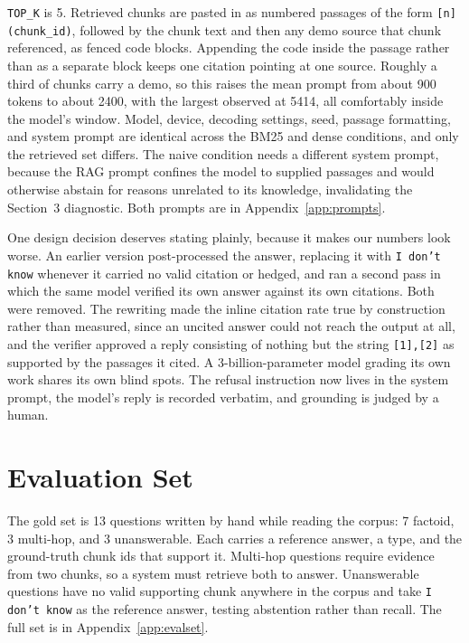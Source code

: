 \documentclass[10pt,a4paper]{article}
\begin{document}
\texttt{TOP\_K} is 5. Retrieved chunks are pasted in as numbered passages of the form \texttt{[n] (chunk\_id)}, followed by the chunk text and then any demo source that chunk referenced, as fenced code blocks. Appending the code inside the passage rather than as a separate block keeps one citation pointing at one source. Roughly a third of chunks carry a demo, so this raises the mean prompt from about 900 tokens to about 2400, with the largest observed at 5414, all comfortably inside the model's window. Model, device, decoding settings, seed, passage formatting, and system prompt are identical across the BM25 and dense conditions, and only the retrieved set differs. The naive condition needs a different system prompt, because the RAG prompt confines the model to supplied passages and would otherwise abstain for reasons unrelated to its knowledge, invalidating the Section~3 diagnostic. Both prompts are in Appendix~\ref{app:prompts}.

One design decision deserves stating plainly, because it makes our numbers look worse. An earlier version post-processed the answer, replacing it with \texttt{I don't know} whenever it carried no valid citation or hedged, and ran a second pass in which the same model verified its own answer against its own citations. Both were removed. The rewriting made the inline citation rate true by construction rather than measured, since an uncited answer could not reach the output at all, and the verifier approved a reply consisting of nothing but the string \texttt{[1],[2]} as supported by the passages it cited. A 3-billion-parameter model grading its own work shares its own blind spots. The refusal instruction now lives in the system prompt, the model's reply is recorded verbatim, and grounding is judged by a human.

\section{Evaluation Set}

The gold set is 13 questions written by hand while reading the corpus: 7 factoid, 3 multi-hop, and 3 unanswerable. Each carries a reference answer, a type, and the ground-truth chunk ids that support it. Multi-hop questions require evidence from two chunks, so a system must retrieve both to answer. Unanswerable questions have no valid supporting chunk anywhere in the corpus and take \texttt{I don't know} as the reference answer, testing abstention rather than recall. The full set is in Appendix~\ref{app:evalset}.
\end{document}
